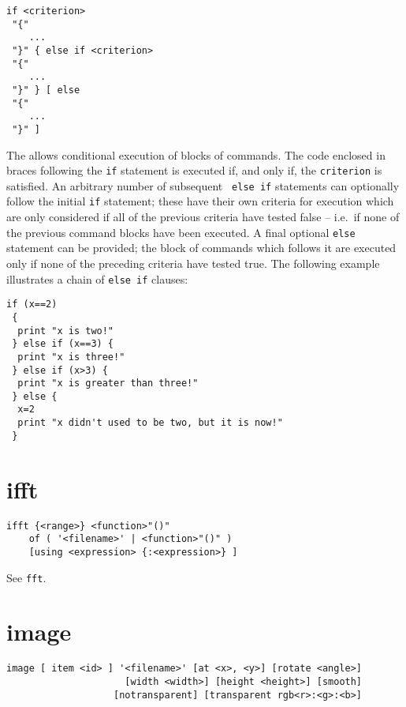 \begin{verbatim}
if <criterion>
 "{"
    ...
 "}" { else if <criterion>
 "{"
    ...
 "}" } [ else
 "{"
    ...
 "}" ]
\end{verbatim}

The  allows conditional execution of blocks of commands.  The code
enclosed in braces following the {\tt if} statement is executed if, and only
if, the {\tt criterion} is satisfied.  An arbitrary number of subsequent {\tt
else if} statements can optionally follow the initial {\tt if} statement; these
have their own criteria for execution which are only considered if all of the
previous criteria have tested false -- i.e.\ if none of the previous command
blocks have been executed.  A final optional {\tt else} statement can be
provided; the block of commands which follows it are executed only if none of
the preceding criteria have tested true.  The following example illustrates a
chain of {\tt else if} clauses:

\begin{verbatim}
if (x==2)
 {
  print "x is two!"
 } else if (x==3) {
  print "x is three!"
 } else if (x>3) {
  print "x is greater than three!"
 } else {
  x=2
  print "x didn't used to be two, but it is now!"
 }
\end{verbatim}


\section{ifft}

\begin{verbatim}
ifft {<range>} <function>"()"
    of ( '<filename>' | <function>"()" )
    [using <expression> {:<expression>} ]
\end{verbatim}

See {\tt fft}.


\section{image}

\begin{verbatim}
image [ item <id> ] '<filename>' [at <x>, <y>] [rotate <angle>]
                     [width <width>] [height <height>] [smooth]
                   [notransparent] [transparent rgb<r>:<g>:<b>]
\end{verbatim}

